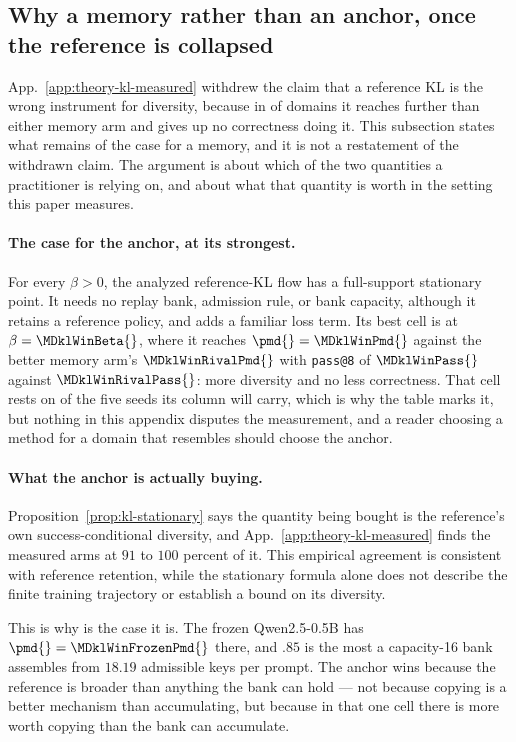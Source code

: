 \subsection{Why a memory rather than an anchor, once the reference is collapsed}
\label{app:theory-kl-case}

App.~\ref{app:theory-kl-measured} withdrew the claim that a reference KL is the
wrong instrument for diversity, because in \MDklFreeDomains{} of \MDklDomains{}
domains it reaches further than either memory arm and gives up no correctness
doing it. This subsection states what remains of the
case for a memory, and it is not a restatement of the withdrawn claim. The
argument is about which of the two quantities a practitioner is relying on, and
about what that quantity is worth in the setting this paper measures.

\paragraph{The case for the anchor, at its strongest.}
For every $\beta>0$, the analyzed reference-KL flow has a full-support
stationary point. It needs no replay bank, admission rule, or bank capacity,
although it retains a reference policy, and adds a familiar loss term. Its best cell is \MDklWinDomain{} at $\beta=\MDklWinBeta{}$,
where it reaches $\pmd{}=\MDklWinPmd{}$ against the better memory arm's
$\MDklWinRivalPmd{}$ with \texttt{pass@8} of $\MDklWinPass{}$ against
$\MDklWinRivalPass{}$: more diversity and no less correctness. That cell rests on
\MDklWinSeeds{} of the five seeds its column will carry, which is why the table
marks it, but nothing in this appendix disputes the measurement, and a reader
choosing a method for a domain that resembles \MDklWinDomain{} should choose
the anchor.

\paragraph{What the anchor is actually buying.}
Proposition~\ref{prop:kl-stationary} says the quantity being bought is the
reference's own success-conditional diversity, and
App.~\ref{app:theory-kl-measured} finds the measured arms at $91$ to $100$
percent of it. This empirical agreement is consistent with reference
retention, while the stationary formula alone does not describe the finite
training trajectory or establish a bound on its diversity.

This is why \MDklWinDomain{} is the case it is. The frozen Qwen2.5-0.5B has
$\pmd{}=\MDklWinFrozenPmd{}$ there, and $.85$ is the most a capacity-16 bank assembles from
$18.19$ admissible keys per prompt. The anchor wins because the reference is
broader than anything the bank can hold --- not because copying is a better
mechanism than accumulating, but because in that one cell there is more worth
copying than the bank can accumulate.

